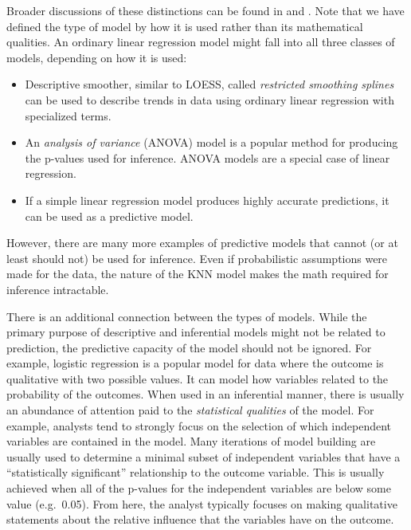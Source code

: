 \documentclass[11pt]{book}
\begin{document}
Broader discussions of these distinctions can be found in \citet{breiman2001} and \citet{shmueli2010}. Note that we have defined the type of model by how it is used rather than its mathematical qualities. An ordinary linear regression model might fall into all three classes of models, depending on how it is used:

\begin{itemize}
\item
  Descriptive smoother, similar to LOESS, called \emph{restricted smoothing splines} \citep{Durrleman1989} can be used to describe trends in data using ordinary linear regression with specialized terms.
\item
  An \emph{analysis of variance} (ANOVA) model is a popular method for producing the p-values used for inference. ANOVA models are a special case of linear regression.
\item
  If a simple linear regression model produces highly accurate predictions, it can be used as a predictive model.
\end{itemize}

However, there are many more examples of predictive models that cannot (or at least should not) be used for inference. Even if probabilistic assumptions were made for the data, the nature of the KNN model makes the math required for inference intractable.

There is an additional connection between the types of models. While the primary purpose of descriptive and inferential models might not be related to prediction, the predictive capacity of the model should not be ignored. For example, logistic regression is a popular model for data where the outcome is qualitative with two possible values. It can model how variables related to the probability of the outcomes. When used in an inferential manner, there is usually an abundance of attention paid to the \emph{statistical qualities} of the model. For example, analysts tend to strongly focus on the selection of which independent variables are contained in the model. Many iterations of model building are usually used to determine a minimal subset of independent variables that have a ``statistically significant'' relationship to the outcome variable. This is usually achieved when all of the p-values for the independent variables are below some value (e.g.~0.05). From here, the analyst typically focuses on making qualitative statements about the relative influence that the variables have on the outcome.
\end{document}
